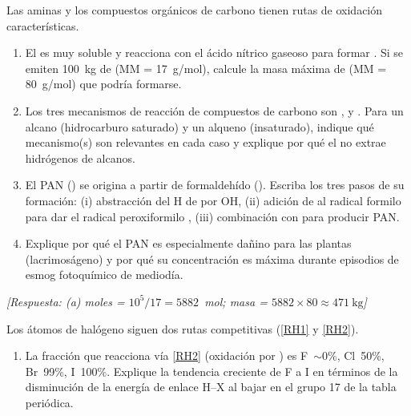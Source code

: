 \begin{bloque_ejercicios}
\begin{ejercicios}
\item Las aminas y los compuestos org\'anicos de carbono
tienen rutas de oxidaci\'on caracter\'isticas.

\begin{enumerate}[label=\alph*)]
    \item El  es muy soluble y reacciona con el
          \'acido n\'itrico gaseoso para formar
          . Si se emiten
          \SI{100}{\kilo\gram} de  (MM = 17~g/mol),
          calcule la masa m\'axima de 
          (MM = 80~g/mol) que podr\'ia formarse.

    \item Los tres mecanismos de reacci\'on de compuestos
          de carbono son ,  y .
          Para un alcano (hidrocarburo saturado) y un alqueno
          (insaturado), indique qu\'e mecanismo(s) son
          relevantes en cada caso y explique por qu\'e el
           no extrae hidr\'ogenos de alcanos.

    \item El PAN () se origina a partir de
          formaldeh\'ido (). Escriba los tres
          pasos de su formaci\'on:
          (i) abstracci\'on del H de  por OH,
          (ii) adici\'on de  al radical formilo para
          dar el radical peroxiformilo ,
          (iii) combinaci\'on con  para producir PAN.

    \item Explique por qu\'e el PAN es especialmente da\~nino
          para las plantas (lacrimos\'ageno) y por qu\'e
          su concentraci\'on es m\'axima durante episodios
          de esmog fotoqu\'imico de mediod\'ia.
\end{enumerate}

\textit{[Respuesta:
(a) moles  = $10^5/17 = 5882$~mol;
    masa  = $5882\times80
    \approx \SI{471}{\kilo\gram}$]}

\item Los \'atomos de hal\'ogeno siguen dos rutas
competitivas (\ref{RH1} y \ref{RH2}).

\begin{enumerate}[label=\alph*)]
    \item La fracci\'on que reacciona v\'ia \ref{RH2}
          (oxidaci\'on por ) es F~$\sim$0\%,
          Cl~50\%, Br~99\%, I~100\%.
          Explique la tendencia creciente de F a I en
          t\'erminos de la disminuci\'on de la energ\'ia
          de enlace H--X al bajar en el grupo 17 de la
          tabla peri\'odica.


\end{enumerate}
\end{ejercicios}
\end{bloque_ejercicios}
